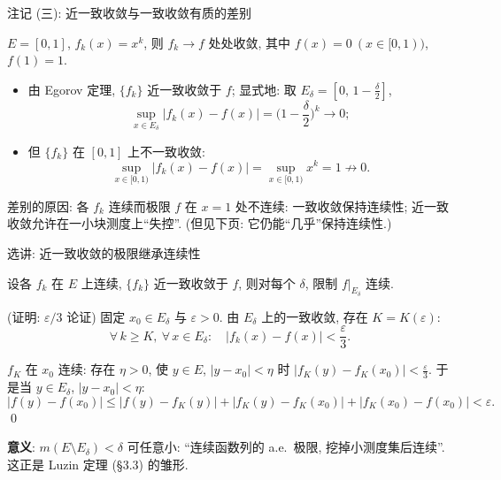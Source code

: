 
\begin{frame}{注记 (三): 近一致收敛与一致收敛有质的差别}

\begin{eg}
$E = [0,1]$, $f_k(x) = x^k$, 则 $f_k \to f$ \alert{处处}收敛, 其中 $f(x) = 0\ (x \in [0,1))$, $f(1) = 1$.

\pause
\begin{itemize}
\item 由 Egorov 定理, $\{f_k\}$ \alert{近一致}收敛于 $f$; 显式地: 取 $E_\delta = [0,\, 1 - \frac{\delta}{2}]$,
\[
\sup_{x \in E_\delta} |f_k(x) - f(x)| = \Big(1 - \frac{\delta}{2}\Big)^k \longrightarrow 0 ;
\]
\item 但 $\{f_k\}$ 在 $[0,1]$ 上\alert{不一致}收敛:
\[
\sup_{x \in [0,1)} |f_k(x) - f(x)| = \sup_{x \in [0,1)} x^k = 1 \not\to 0 .
\]
\end{itemize}
\end{eg}

\pause

\begin{attnblock}
差别的原因: 各 $f_k$ 连续而极限 $f$ 在 $x = 1$ 处\alert{不连续}: 一致收敛保持连续性; 近一致收敛允许在\alert{一小块测度}上``失控''. (但见下页: 它仍能``几乎''保持连续性.)
\end{attnblock}

\end{frame}


\graymode
\begin{frame}{选讲: 近一致收敛的极限继承连续性}

\begin{prop}[连续性的继承]
设各 $f_k$ 在 $E$ 上连续, $\{f_k\}$ 近一致收敛于 $f$, 则对每个 $\delta$, 限制 $f\big|_{E_\delta}$ 连续.
\end{prop}

\startproof[bg=yellow, fg=red](证明: $\varepsilon/3$ 论证)
固定 $x_0 \in E_\delta$ 与 $\varepsilon > 0$. 由 $E_\delta$ 上的一致收敛, 存在 $K = K(\varepsilon)$:
\[
\forall\, k \geqslant K,\ \forall\, x \in E_\delta:\quad |f_k(x) - f(x)| < \frac{\varepsilon}{3}.
\]

\pause

$f_K$ 在 $x_0$ 连续: 存在 $\eta > 0$, 使 $y \in E$, $|y - x_0| < \eta$ 时 $|f_K(y) - f_K(x_0)| < \frac{\varepsilon}{3}$. 于是当 $y \in E_\delta$, $|y - x_0| < \eta$:
\[
|f(y) - f(x_0)|
\leqslant |f(y) - f_K(y)| + |f_K(y) - f_K(x_0)| + |f_K(x_0) - f(x_0)|
< \varepsilon .
\]
\qed

\pause

\textbf{意义}: $m(E \setminus E_\delta) < \delta$ 可任意小: ``连续函数列的 a.e.\ 极限, 挖掉小测度集后连续''. 这正是 \alert{Luzin 定理} (\S 3.3) 的雏形.

\end{frame}
\normalmode


